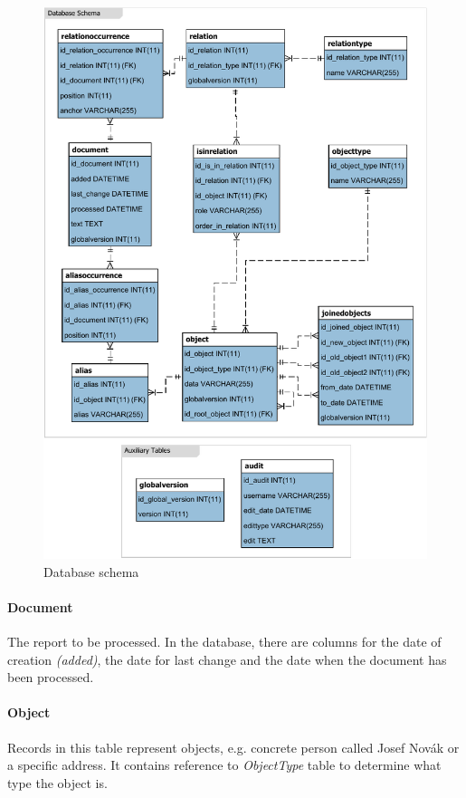 \begin{figure}[!hp]
        \centering
        \includegraphics{Images/DatabaseSchema}
        \caption{Database schema}
        \label{fig:DatabaseSchema}
\end{figure}

\paragraph{Document} The report to be processed. In the database, there are
columns for the date of  creation \emph{(added)}, the date for last change and
the date when the document has been processed.

\paragraph{Object} Records in this table represent objects, e.g. concrete person
called Josef Novák or a specific address.  It contains reference to
\emph{ObjectType} table to determine what type the object is.

